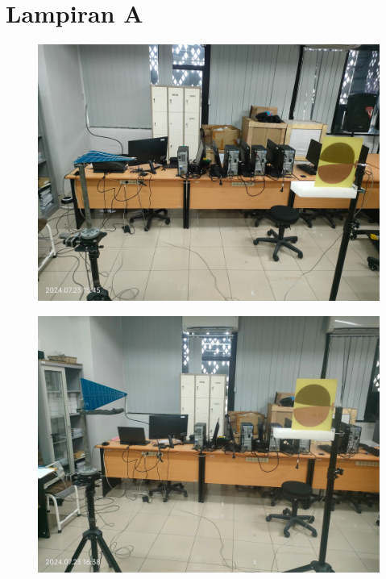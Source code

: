 \chapter*{Lampiran A}

\begin{figure}
    \begin{center}
        \includegraphics[scale=0.08]{pics/Lampiran/Horizonal.jpg}
    \end{center}
\end{figure}

\begin{figure}
    \begin{center}
        \includegraphics[scale=0.08]{pics/Lampiran/Vertikal.jpg}
    \end{center}
\end{figure}


